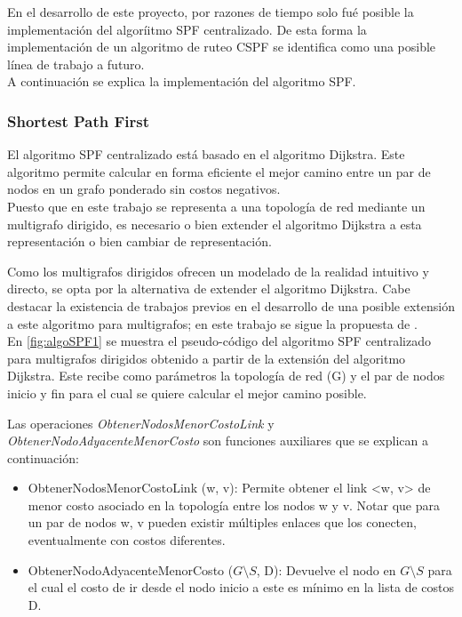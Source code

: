 En el desarrollo de este proyecto, por razones de tiempo solo fu\'e posible la implementaci\'on del algor\'iitmo SPF centralizado. De esta forma la implementaci\'on de un algoritmo de ruteo CSPF se identifica como una posible l\'inea de trabajo a futuro.\\

A continuaci\'on se explica la implementaci\'on del algoritmo SPF. 

\subsubsection{Shortest Path First}
El algoritmo SPF centralizado est\'a basado en el algoritmo Dijkstra. Este algoritmo permite calcular en forma eficiente el mejor camino entre un par de nodos en un grafo ponderado sin costos negativos.\\

Puesto que en este trabajo se representa a una topolog\'ia de red mediante un multigrafo dirigido, es necesario o bien extender el algoritmo Dijkstra a esta representaci\'on o bien cambiar de representaci\'on. 

Como los multigrafos dirigidos ofrecen un modelado de la realidad intuitivo y directo, se opta por la alternativa de extender el algoritmo Dijkstra. Cabe destacar la existencia de trabajos previos en el desarrollo de una posible extensi\'on a este algoritmo para multigrafos; en este trabajo se sigue la propuesta de \cite{biswas2013generalization}.\\


En \ref{fig:algoSPF1} se muestra el pseudo-c\'odigo del algoritmo SPF centralizado para multigrafos dirigidos obtenido a partir de la extensi\'on del algoritmo Dijkstra. Este recibe como par\'ametros la topolog\'ia de red (G) y el par de nodos inicio y fin para el cual se quiere calcular el mejor camino posible. 

Las operaciones \textit{ObtenerNodosMenorCostoLink} y \textit{ObtenerNodoAdyacenteMenorCosto} son funciones auxiliares que se explican a continuación:

\begin{itemize}
\item ObtenerNodosMenorCostoLink (w, v): Permite obtener el link <w, v> de menor costo asociado en la topolog\'ia entre los nodos w y v. Notar que para un par de nodos w, v pueden existir m\'ultiples enlaces que los conecten, eventualmente con costos diferentes. 

\item ObtenerNodoAdyacenteMenorCosto ($G\setminus S$, D): Devuelve el nodo en $G\setminus S$ para el cual el costo de ir desde el nodo inicio a este es m\'inimo en la lista de costos D.
\end{itemize}

